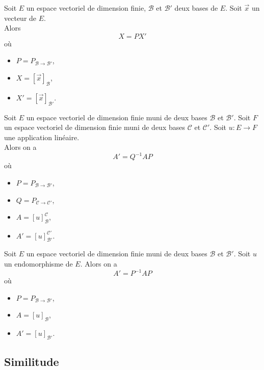 \documentclass{book}
\begin{document}
\begin{Proposition}
Soit $E$ un espace vectoriel de dimension finie, $\mathcal{B}$ et $\mathcal{B}'$ deux bases de $E$.
Soit $\vec{x}$ un vecteur de $E$.\\
Alors \[ X = PX'\]
où
\begin{itemize}
\item $P = P_{\mathcal{B} \to \mathcal{B}'}$,
\item $X = [\vec{x}]_{\mathcal{B}}$,
\item $X' = [\vec{x}]_{\mathcal{B}'}$.
\end{itemize}
\end{Proposition}
\begin{Proposition}
Soit $E$ un espace vectoriel de dimension finie muni de deux bases $\mathcal{B}$ et $\mathcal{B}'$.
Soit $F$ un espace vectoriel de dimension finie muni de deux bases $\mathcal{C}$ et $\mathcal{C}'$.
Soit $u:E\to F$ une application linéaire.\\
Alors on a \[ A' = Q^{-1} A P \]
où
\begin{itemize}
\item $P = P_{\mathcal{B} \to \mathcal{B}'}$,
\item $Q = P_{\mathcal{C} \to \mathcal{C}'}$,
\item $A = [u]_{\mathcal{B}}^{\mathcal{C}}$,
\item $A' = [u]_{\mathcal{B}'}^{\mathcal{C}'}$.
\end{itemize}
\end{Proposition}
\begin{Corollaire}

Soit $E$ un espace vectoriel de dimension finie muni de deux bases $\mathcal{B}$ et $\mathcal{B}'$.
Soit $u$ un endomorphisme de $E$.
Alors on a \[ A' = P^{-1} A P \]
où
\begin{itemize}
\item $P =  P_{\mathcal{B} \to \mathcal{B}'}$,
\item $A =  [u]_{\mathcal{B}}$,
\item $A' =  [u]_{\mathcal{B}'}$.
\end{itemize}
\end{Corollaire}

\subsection{Similitude}
\end{document}
